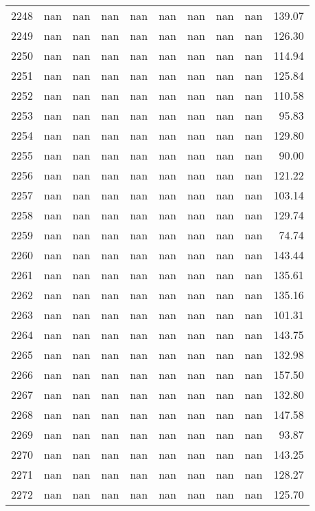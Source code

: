 \begin{tabular}{lrrrrrrrrr}
2248 & nan & nan & nan & nan & nan & nan & nan & nan & 139.07 \\
2249 & nan & nan & nan & nan & nan & nan & nan & nan & 126.30 \\
2250 & nan & nan & nan & nan & nan & nan & nan & nan & 114.94 \\
2251 & nan & nan & nan & nan & nan & nan & nan & nan & 125.84 \\
2252 & nan & nan & nan & nan & nan & nan & nan & nan & 110.58 \\
2253 & nan & nan & nan & nan & nan & nan & nan & nan & 95.83 \\
2254 & nan & nan & nan & nan & nan & nan & nan & nan & 129.80 \\
2255 & nan & nan & nan & nan & nan & nan & nan & nan & 90.00 \\
2256 & nan & nan & nan & nan & nan & nan & nan & nan & 121.22 \\
2257 & nan & nan & nan & nan & nan & nan & nan & nan & 103.14 \\
2258 & nan & nan & nan & nan & nan & nan & nan & nan & 129.74 \\
2259 & nan & nan & nan & nan & nan & nan & nan & nan & 74.74 \\
2260 & nan & nan & nan & nan & nan & nan & nan & nan & 143.44 \\
2261 & nan & nan & nan & nan & nan & nan & nan & nan & 135.61 \\
2262 & nan & nan & nan & nan & nan & nan & nan & nan & 135.16 \\
2263 & nan & nan & nan & nan & nan & nan & nan & nan & 101.31 \\
2264 & nan & nan & nan & nan & nan & nan & nan & nan & 143.75 \\
2265 & nan & nan & nan & nan & nan & nan & nan & nan & 132.98 \\
2266 & nan & nan & nan & nan & nan & nan & nan & nan & 157.50 \\
2267 & nan & nan & nan & nan & nan & nan & nan & nan & 132.80 \\
2268 & nan & nan & nan & nan & nan & nan & nan & nan & 147.58 \\
2269 & nan & nan & nan & nan & nan & nan & nan & nan & 93.87 \\
2270 & nan & nan & nan & nan & nan & nan & nan & nan & 143.25 \\
2271 & nan & nan & nan & nan & nan & nan & nan & nan & 128.27 \\
2272 & nan & nan & nan & nan & nan & nan & nan & nan & 125.70 \\

\end{tabular}
